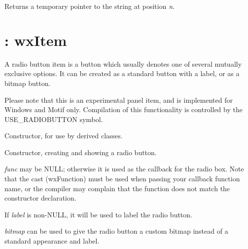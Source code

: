 
Returns a temporary pointer to the string at position {\it n}.


\section{: wxItem}\label{wxradiobutton}

A radio button item is a button which usually denotes one of several mutually
exclusive options. It can be created as a standard button with a label, or as a bitmap button.

Please note that this is an experimental panel item, and is implemented for Windows
and Motif only. Compilation of this functionality is controlled by the USE\_RADIOBUTTON symbol.

\label{constrradiobutton}


Constructor, for use by derived classes.



Constructor, creating and showing a radio button.

{\it func} may be NULL; otherwise it is used as the callback for the
radio box.  Note that the cast (wxFunction) must be used when passing your
callback function name, or the compiler may complain that the function
does not match the constructor declaration.

If {\it label} is non-NULL, it will be used to label the radio button.

{\it bitmap} can be used to give the radio button a custom bitmap
instead of a standard appearance and label.

